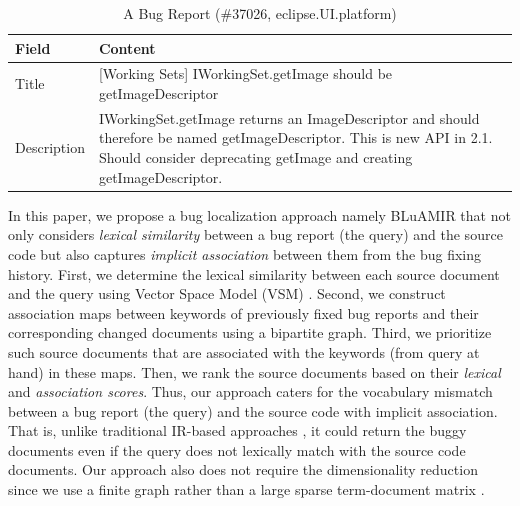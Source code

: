 \documentclass[conference]{IEEEtran}
\begin{document}
\begin{table}[!tb]
	\caption{A Bug Report (\#37026, eclipse.UI.platform)}
	\label{tab:BugInfo}
	\vspace{-.4cm}
	\begin{center}
		\begin{tabular}{ p{1.5cm} | p{6cm}}
			\hline
			\textbf{Field}  & \textbf{Content} \\
			\hline
			\hline
			Title & [Working Sets] IWorkingSet.getImage should be getImageDescriptor
			\\
			\hline
			Description &  
		IWorkingSet.getImage returns an ImageDescriptor and should therefore be named 
		getImageDescriptor.
		This is new API in 2.1. Should consider deprecating getImage and creating 
		getImageDescriptor.\\
			\hline
		\end{tabular}
	\end{center}
\end{table}


In this paper, we propose a bug localization approach namely BLuAMIR that not only considers \emph{lexical similarity} between a bug report (the query) and the source code but also captures \emph{implicit association} between them from the bug fixing history. First, we determine the lexical similarity between each source document and the query using Vector Space Model (VSM) \cite{Jian}.
Second, we construct association maps between keywords of previously fixed bug reports and their corresponding changed documents using a bipartite graph. Third, we prioritize such source documents that are associated with the keywords (from query at hand) in these maps. Then, we rank the source documents based on their \emph{lexical} and \emph{association scores}.
Thus, our approach caters for the vocabulary mismatch between a bug report (the query) and the source code with implicit association. 
That is, unlike traditional IR-based approaches \cite{Jian,Saha}, it could return the buggy documents even if the query does not lexically match with the source code documents. Our approach also does not require the dimensionality reduction since we use a finite graph rather than a large sparse term-document matrix \cite{MarcusLSI,MarcusMaletic}.
\end{document}
